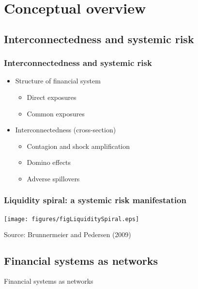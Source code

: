 \documentclass[aspectratio=43,dvipsnames,usenames, svgnames]{beamer}
\begin{document}
\section{Conceptual overview}

\subsection{Interconnectedness and systemic risk}

\begin{frame} %
\frametitle{Interconnectedness and systemic risk}
	\begin{itemize}
		\item Structure of financial system
		\begin{itemize}
			\item Direct exposures
			\item Common exposures
		\end{itemize}
		\smallskip	
		\item Interconnectedness (cross-section) 
		\begin{itemize}
			\item Contagion and shock amplification
			\item Domino effects
			\item Adverse spillovers
		\end{itemize}
	\end{itemize}
\end{frame}

\begin{frame} %
\frametitle{Liquidity spiral: a systemic risk manifestation}
\begin{center}
	\texttt{[image: figures/figLiquiditySpiral.eps]}
\end{center}
\tiny{Source: Brunnermeier and Pedersen (2009)}
\end{frame}

\subsection{Financial systems as networks}

\begin{frame} %
\begin{center}
	\Large{Financial systems as networks}
\end{center}
\end{frame}
\end{document}
